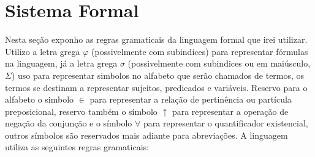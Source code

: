 \section{Sistema Formal}

Nesta seção exponho as regras gramaticais da linguagem formal
que irei utilizar.
Utilizo a letra grega $\varphi$ (possivelmente com subindices)
para representar fórmulas na linguagem,
já a letra grega $\sigma$
(possivelmente com subindices ou em maiúsculo, $\Sigma$)
uso para representar simbolos no alfabeto que serão chamados de termos,
os termos se destinam a representar sujeitos, predicados e variáveis.
Reservo para o alfabeto o simbolo $\in$
para representar a relação de pertinência ou partícula preposicional,
reservo também o símbolo $\uparrow$ para representar
a operação de negação da conjunção
e o símbolo $\forall$ para representar o quantificador existencial,
outros símbolos são reservados mais adiante para abreviações.
A linguagem utiliza as seguintes regras gramaticais:

